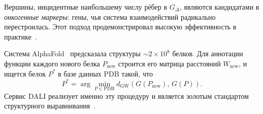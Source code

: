 Вершины, инцидентные наибольшему числу рёбер в $G_\Delta$, являются кандидатами
в \emph{онкогенные маркеры}: гены, чья система взаимодействий радикально перестроилась.
Этот подход продемонстрировал высокую эффективность в практике~\cite{diff_network_cancer}.

\begin{example}
Система AlphaFold~\cite{alphafold2021} предсказала структуры $\sim 2 \times 10^8$ белков.
Для аннотации функции каждого нового белка $P_{\mathrm{new}}$ строится его матрица расстояний
$W_{\mathrm{new}}$, и ищется белок $P^*$ в базе данных PDB такой, что
\[
    P^* = \arg\min_{P \in \mathrm{PDB}} d_{\mathrm{GW}}(G(P_{\mathrm{new}}),\, G(P)).
\]
Сервис DALI реализует именно эту процедуру и является золотым стандартом
структурного выравнивания~\cite{dali1993}.
\end{example}
